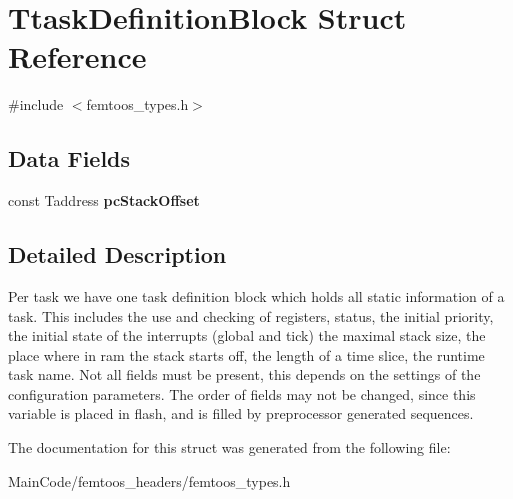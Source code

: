 \hypertarget{struct_ttask_definition_block}{\section{Ttask\-Definition\-Block Struct Reference}
\label{struct_ttask_definition_block}
}


{\ttfamily \#include $<$femtoos\-\_\-types.\-h$>$}

\subsection*{Data Fields}
\begin{DoxyCompactItemize}
\item 
\hypertarget{struct_ttask_definition_block_a9739e24eceb90dce22418de3be734bc4}{const Taddress {\bfseries pc\-Stack\-Offset}}\label{struct_ttask_definition_block_a9739e24eceb90dce22418de3be734bc4}

\end{DoxyCompactItemize}


\subsection{Detailed Description}
Per task we have one task definition block which holds all static information of a task. This includes the use and checking of registers, status, the initial priority, the initial state of the interrupts (global and tick) the maximal stack size, the place where in ram the stack starts off, the length of a time slice, the runtime task name. Not all fields must be present, this depends on the settings of the configuration parameters. The order of fields may not be changed, since this variable is placed in flash, and is filled by preprocessor generated sequences. 

The documentation for this struct was generated from the following file\-:\begin{DoxyCompactItemize}
\item 
Main\-Code/femtoos\-\_\-headers/femtoos\-\_\-types.\-h\end{DoxyCompactItemize}
